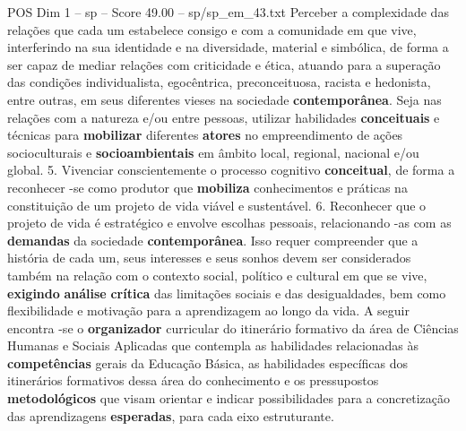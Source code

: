 \begin{textsample}{POS Dim 1 – sp – Score 49.00 – sp/sp\_em\_43.txt}
Perceber a complexidade das relações que cada um estabelece consigo e com a comunidade em que vive, interferindo na sua identidade e na diversidade, material e simbólica, de forma a ser capaz de mediar relações com criticidade e ética, atuando para a superação das condições individualista, egocêntrica, preconceituosa, racista e hedonista, entre outras, em seus diferentes vieses na sociedade \textbf{contemporânea}.
Seja nas relações com a natureza e/ou entre pessoas, utilizar habilidades \textbf{conceituais} e técnicas para \textbf{mobilizar} diferentes \textbf{atores} no empreendimento de ações socioculturais e \textbf{socioambientais} em âmbito local, regional, nacional e/ou global. 5.
Vivenciar conscientemente o processo cognitivo \textbf{conceitual}, de forma a reconhecer -se como produtor que \textbf{mobiliza} conhecimentos e práticas na constituição de um projeto de vida viável e sustentável. 6.
Reconhecer que o projeto de vida é estratégico e envolve escolhas pessoais, relacionando -as com as \textbf{demandas} da sociedade \textbf{contemporânea}.
Isso requer compreender que a história de cada um, seus interesses e seus sonhos devem ser considerados também na relação com o contexto social, político e cultural em que se vive, \textbf{exigindo} \textbf{análise} \textbf{crítica} das limitações sociais e das desigualdades, bem como flexibilidade e motivação para a aprendizagem ao longo da vida.
A seguir encontra -se o \textbf{organizador} curricular do itinerário formativo da área de Ciências Humanas e Sociais Aplicadas que contempla as habilidades relacionadas às \textbf{competências} gerais da Educação Básica, as habilidades específicas dos itinerários formativos dessa área do conhecimento e os pressupostos \textbf{metodológicos} que visam orientar e indicar possibilidades para a concretização das aprendizagens \textbf{esperadas}, para cada eixo estruturante.

\end{textsample}
